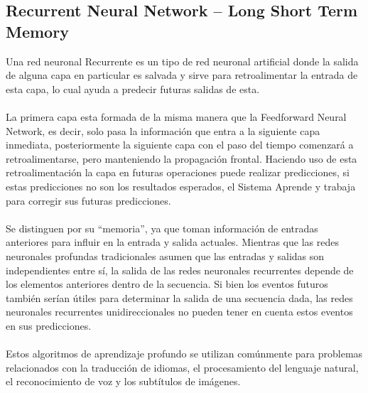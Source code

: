 \documentclass[12pt, a4paper, titlepage]{report}
\begin{document}
				\subsection{Recurrent Neural Network – Long Short Term Memory}
				Una red neuronal \gls{Recurrente} es un tipo de red neuronal artificial donde la salida de alguna capa en particular es salvada y sirve para retroalimentar la entrada de esta capa, lo cual ayuda a predecir futuras salidas de esta.\\\\
				La primera capa esta formada de la misma manera que la Feedforward Neural Network, es decir, solo pasa la información que entra a la siguiente capa inmediata, posteriormente la siguiente capa con el paso del tiempo comenzará a retroalimentarse, pero manteniendo la propagación frontal. Haciendo uso de esta retroalimentación la capa en futuras operaciones puede realizar predicciones, si estas predicciones no son los resultados esperados, el \gls{Sistema} \gls{Aprende} y trabaja para corregir sus futuras predicciones.\cite{refTiposRedesNeu1}\\\\
				Se distinguen por su “memoria”, ya que toman información de entradas anteriores para influir en la entrada y salida actuales. Mientras que las redes neuronales profundas tradicionales asumen que las entradas y salidas son independientes entre sí, la salida de las redes neuronales recurrentes depende de los elementos anteriores dentro de la secuencia. Si bien los eventos futuros también serían útiles para determinar la salida de una secuencia dada, las redes neuronales recurrentes unidireccionales no pueden tener en cuenta estos eventos en sus predicciones.\cite{refTiposRedesNeu4}\\\\
				Estos algoritmos de aprendizaje profundo se utilizan comúnmente para problemas relacionados con la traducción de idiomas, el procesamiento del lenguaje natural, el reconocimiento de voz y los subtítulos de imágenes.
				\newpage
\end{document}
